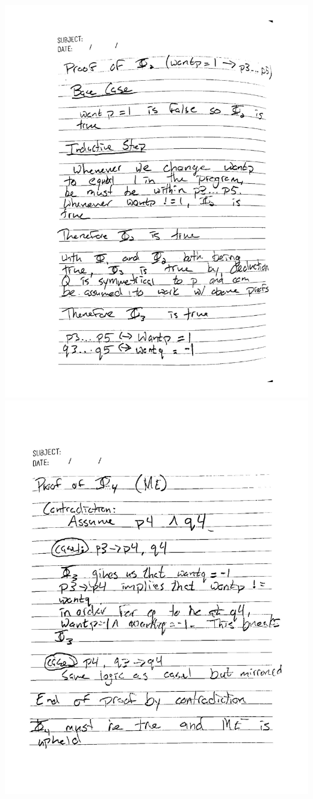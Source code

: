 \documentclass[12pt]{article}
\begin{document}
        \includegraphics[scale=0.8]{Assignment3/2.pdf}
        \newpage
        \includegraphics[scale=0.8]{Assignment3/3.pdf}
        \newpage
\end{document}
